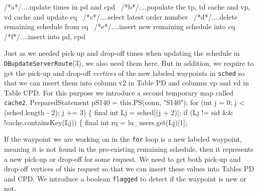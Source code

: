 \documentclass{article}
\def\nwendcode{\endtrivlist \endgroup}      %
\let\nwdocspar=\par
\theoremstyle{definition}                   %
\begin{document}
/*a*/\LA{}....update times in pd and cpd~{\nwtagstyle{}}\RA{}
/*b*/\LA{}....populate the tp, td cache and vp, vd cache and update cq~{\nwtagstyle{}}\RA{}
/*c*/\LA{}....select latest order number~{\nwtagstyle{}}\RA{}
/*d*/\LA{}....delete remaining schedule from cq~{\nwtagstyle{}}\RA{}
/*e*/\LA{}....insert new remaining schedule into cq~{\nwtagstyle{}}\RA{}
/*f*/\LA{}....insert into pd, cpd~{\nwtagstyle{}}\RA{}
\nwendcode{}\nwdocspar
{\small Just as we needed pick-up and drop-off times when updating the schedule
in {\tt{}DBupdateServerRoute}(3), we also need them here. But in addition, we
require to get the pick-up and drop-off \emph{vertices} of the new labeled
waypoints in {\tt{}sched} so that we can insert them into column \textsf{v2} in
Table PD and columns \textsf{vp} and \textsf{vd} in Table CPD. For this purpose
we introduce a second temporary map called {\tt{}cache2}.}
\nwenddocs{}\endmoddef{}
PreparedStatement pS140 = this.PS(conn, "S140");
for (int j = 0; j < (sched.length - 2); j += 3) \{
  final int Lj = sched[(j + 2)];
  if (Lj != sid && !cache.containsKey(Lj)) \{
    final int rq = lu_users.get(Lj)[1];
\nwendcode{}\nwdocspar
{\small If the waypoint we are working on in the {\tt{}for} loop is a new
labeled waypoint, meaning it is not found in the pre-existing remaining
schedule, then it represents a new pick-up or drop-off for some request.
We need to get both pick-up and drop-off vertices of this request so that
we can insert these values into Tables PD and CPD. We introduce a boolean
{\tt{}flagged} to detect if the waypoint is new or not.}
\nwenddocs{}\plusendmoddef
\end{document}
